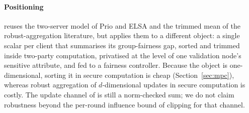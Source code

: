 \paragraph{Positioning}
\rt{} reuses the two-server model of Prio and ELSA and the trimmed mean of the robust-aggregation literature, but applies them to a different object: a single scalar per client that summarises its group-fairness gap, sorted and trimmed inside two-party computation, privatised at the level of one validation node's sensitive attribute, and fed to a fairness controller. Because the object is one-dimensional, sorting it in secure computation is cheap (Section~\ref{sec:mpc}), whereas robust aggregation of $d$-dimensional updates in secure computation is costly. The update channel of \rt{} is still a norm-checked sum; we do not claim robustness beyond the per-round influence bound of clipping for that channel.

